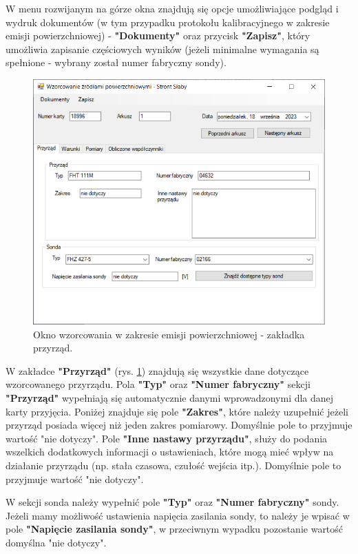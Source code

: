 	W menu rozwijanym na górze okna znajdują się opcje umożliwiające podgląd i wydruk dokumentów (w tym przypadku protokołu kalibracyjnego w zakresie emisji powierzchniowej) - \textbf{"Dokumenty"} oraz przycisk \textbf{"Zapisz"}, który umożliwia zapisanie częściowych wyników (jeżeli minimalne wymagania są spełnione - wybrany został numer fabryczny sondy).
	
	\begin{figure}[htb]
		\centering
		\includegraphics[width=\columnwidth]{obrazki/Wzorcowanie/emisja/przyrzad.png}
		\caption{Okno wzorcowania w zakresie emisji powierzchniowej - zakładka przyrząd.}
		\label{emisjaPrzyrzad}
	\end{figure}
	
	W zakładce \textbf{"Przyrząd"} (rys. \ref{emisjaPrzyrzad}) znajdują się wszystkie dane dotyczące wzorcowanego przyrządu. Pola \textbf{"Typ"} oraz \textbf{"Numer fabryczny"} sekcji \textbf{"Przyrząd"} wypełniają się automatycznie danymi wprowadzonymi dla danej karty przyjęcia. Poniżej znajduje się pole \textbf{"Zakres"}, które należy uzupełnić jeżeli przyrząd posiada więcej niż jeden zakres pomiarowy. Domyślnie pole to przyjmuje wartość "nie dotyczy". Pole \textbf{"Inne nastawy przyrządu"}, służy do podania wszelkich dodatkowych informacji o ustawieniach, które mogą mieć wpływ na działanie przyrządu (np. stała czasowa, czułość wejścia itp.). Domyślnie pole to przyjmuje wartość "nie dotyczy".
	
	W sekcji sonda należy wypełnić pole \textbf{"Typ"} oraz \textbf{"Numer fabryczny"} sondy. Jeżeli mamy możliwość ustawienia napięcia zasilania sondy, to należy je wpisać w pole \textbf{"Napięcie zasilania sondy"}, w przeciwnym wypadku pozostanie wartość domyślna "nie dotyczy".
	
